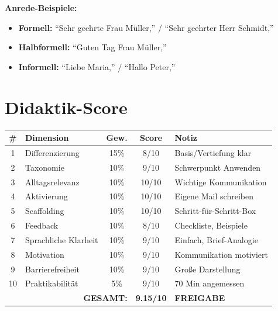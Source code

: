 \documentclass[11pt,a4paper]{article}
\begin{document}
\textbf{Anrede-Beispiele:}
\begin{itemize}
    \item \textbf{Formell:} ``Sehr geehrte Frau Müller,'' / ``Sehr geehrter Herr Schmidt,''
    \item \textbf{Halbformell:} ``Guten Tag Frau Müller,''
    \item \textbf{Informell:} ``Liebe Maria,'' / ``Hallo Peter,''
\end{itemize}

\section{Didaktik-Score}

\begin{scorebox}
\begin{tabular}{|c|l|c|c|p{3.5cm}|}
\hline
\# & Dimension & Gew. & Score & Notiz \\
\hline
1 & Differenzierung & 15\% & 8/10 & Basis/Vertiefung klar \\
2 & Taxonomie & 10\% & 9/10 & Schwerpunkt Anwenden \\
3 & Alltagsrelevanz & 10\% & 10/10 & Wichtige Kommunikation \\
4 & Aktivierung & 10\% & 10/10 & Eigene Mail schreiben \\
5 & Scaffolding & 10\% & 10/10 & Schritt-für-Schritt-Box \\
6 & Feedback & 10\% & 8/10 & Checkliste, Beispiele \\
7 & Sprachliche Klarheit & 10\% & 9/10 & Einfach, Brief-Analogie \\
8 & Motivation & 10\% & 9/10 & Kommunikation motiviert \\
9 & Barrierefreiheit & 10\% & 9/10 & Große Darstellung \\
10 & Praktikabilität & 5\% & 9/10 & 70 Min angemessen \\
\hline
\multicolumn{3}{|r|}{\textbf{GESAMT:}} & \textbf{9.15/10} & \textcolor{successgreen}{\textbf{FREIGABE}} \\
\hline
\end{tabular}
\end{scorebox}
\end{document}
